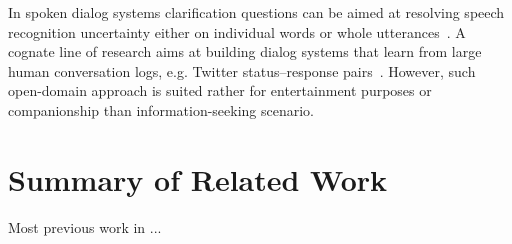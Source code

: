 In spoken dialog systems clarification questions can be aimed at resolving speech recognition uncertainty either on individual words or whole utterances~\cite{stoyanchev2013}.
A cognate line of research aims at building dialog systems that learn from large human conversation logs, e.g. Twitter status--response pairs~\cite{ritter2011}.
However, such open-domain approach is suited rather for entertainment purposes or companionship than information-seeking scenario.









\section{Summary of Related Work}

Most previous work in ...

\clearpage